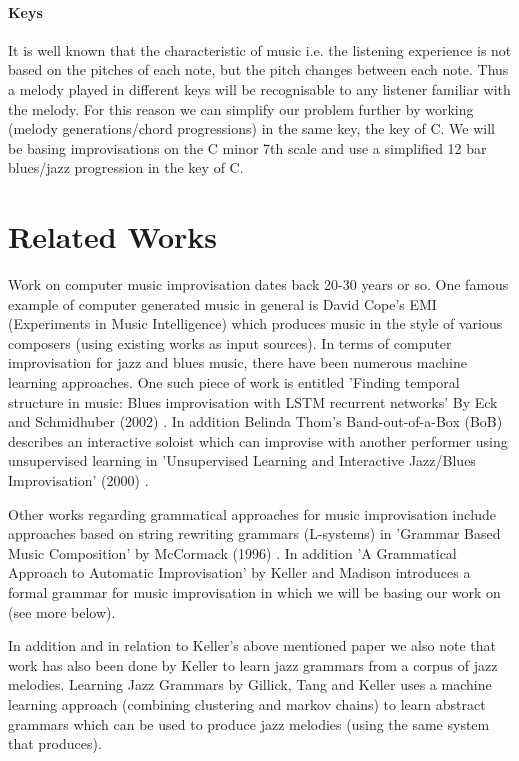 \documentclass[pdftex,12pt,a4paper]{report}
\begin{document}
\paragraph{Keys}
It is well known that the characteristic of music i.e. the listening experience is not based on the pitches of each note, but the pitch changes between each note. Thus a melody played in different keys will be recognisable to any listener familiar with the melody. For this reason we can simplify our problem further by working (melody generations/chord progressions) in the same key, the key of C. We will be basing improvisations on the C minor 7th scale and use a simplified 12 bar blues/jazz progression in the key of C.

\section{Related Works}
Work on computer music improvisation dates back 20-30 years or so. One famous example of computer generated music in general is David Cope's EMI (Experiments in Music Intelligence) which produces music in the style of various composers (using existing works as input sources). In terms of computer improvisation for jazz and blues music, there have been numerous machine learning approaches. One such piece of work is entitled 'Finding temporal structure in music: Blues improvisation with LSTM recurrent networks' By Eck and Schmidhuber (2002) \cite{eck02}. In addition Belinda Thom's Band-out-of-a-Box (BoB) describes an interactive soloist which can improvise with another performer using unsupervised learning in 'Unsupervised Learning and Interactive Jazz/Blues Improvisation' (2000) \cite{thom2000}.

Other works regarding grammatical approaches for music improvisation include approaches based on string rewriting grammars (L-systems) in 'Grammar Based Music Composition' by McCormack (1996) \cite{mccormack96}. In addition 'A Grammatical Approach to Automatic Improvisation' by Keller and Madison \cite{keller07} introduces a formal grammar for music improvisation in which we will be basing our work on (see more below).

In addition and in relation to Keller's above mentioned paper \cite{keller07} we also note that work has also been done by Keller to learn jazz grammars from a corpus of jazz melodies. Learning Jazz Grammars by Gillick, Tang and Keller \cite{keller_gillick09} uses a machine learning approach (combining clustering and markov chains) to learn abstract grammars which can be used to produce jazz melodies (using the same system that \cite{keller07} produces). 
\end{document}
